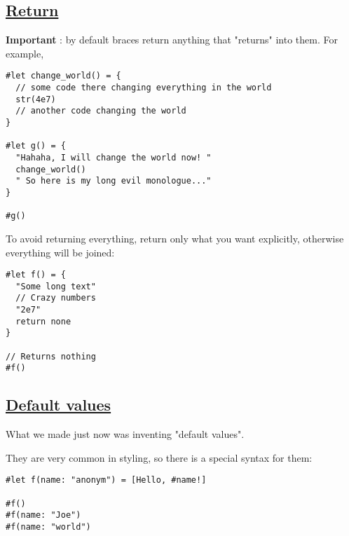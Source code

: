 \pandocbounded{}

\subsection{\texorpdfstring{\hyperref[return]{Return}}{Return}}\label{return}

\textbf{Important} : by default braces return anything that "returns"
into them. For example,

\begin{verbatim}
#let change_world() = {
  // some code there changing everything in the world
  str(4e7)
  // another code changing the world
}

#let g() = {
  "Hahaha, I will change the world now! "
  change_world()
  " So here is my long evil monologue..."
}

#g()
\end{verbatim}

\pandocbounded{}

To avoid returning everything, return only what you want explicitly,
otherwise everything will be joined:

\begin{verbatim}
#let f() = {
  "Some long text"
  // Crazy numbers
  "2e7"
  return none
}

// Returns nothing
#f()
\end{verbatim}

\pandocbounded{}

\subsection{\texorpdfstring{\hyperref[default-values]{Default
values}}{Default values}}\label{default-values}

What we made just now was inventing "default values".

They are very common in styling, so there is a special syntax for them:

\begin{verbatim}
#let f(name: "anonym") = [Hello, #name!]

#f()
#f(name: "Joe")
#f(name: "world")
\end{verbatim}

